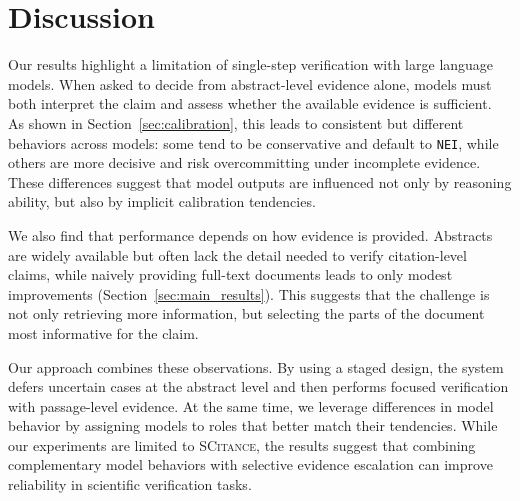 \documentclass{article}
\theoremstyle{plain}
\theoremstyle{definition}
\theoremstyle{remark}
\begin{document}

\section{Discussion}






Our results highlight a limitation of single-step verification with large language models. When asked to decide from abstract-level evidence alone, models must both interpret the claim and assess whether the available evidence is sufficient. As shown in Section~\ref{sec:calibration}, this leads to consistent but different behaviors across models: some tend to be conservative and default to \texttt{NEI}, while others are more decisive and risk overcommitting under incomplete evidence. These differences suggest that model outputs are influenced not only by reasoning ability, but also by implicit calibration tendencies.

We also find that performance depends on how evidence is provided. Abstracts are widely available but often lack the detail needed to verify citation-level claims, while naively providing full-text documents leads to only modest improvements (Section~\ref{sec:main_results}). This suggests that the challenge is not only retrieving more information, but selecting the parts of the document most informative for the claim.


Our approach combines these observations. By using a staged design, the system defers uncertain cases at the abstract level and then performs focused verification with passage-level evidence. At the same time, we leverage differences in model behavior by assigning models to roles that better match their tendencies. While our experiments are limited to \textsc{SCitance}, the results suggest that combining complementary model behaviors with selective evidence escalation can improve reliability in scientific verification tasks.
\end{document}
